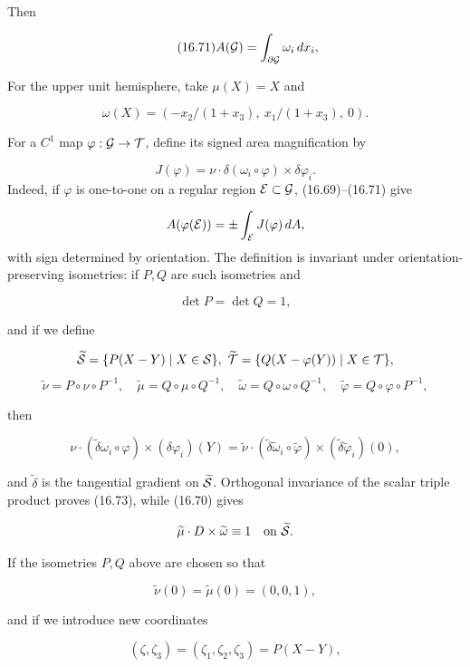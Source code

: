 Then

\begin{equation}\tag{16.71}
A(\mathcal{G})=\int_{\partial\mathcal{G}}\omega_i\,dx_i,
\end{equation}

For the upper unit hemisphere, take $\mu(X)=X$ and

\[
\omega(X)=(-x_2/(1+x_3),\ x_1/(1+x_3),\ 0).
\]

For a $C^1$ map $\varphi:\mathcal{G}\to\mathcal{T}$, define its signed area
magnification by

\begin{equation}\tag{16.72}
J(\varphi)=\nu\cdot
\delta(\omega_i\circ\varphi)\times\delta\varphi_i.
\end{equation}
Indeed, if $\varphi$ is one-to-one on a regular region $\mathcal{E}\subset\mathcal{G}$,
(16.69)--(16.71) give

\[
A(\varphi(\mathcal{E}))
=\pm\int_{\mathcal{E}} J(\varphi)\,dA,
\]
with sign determined by orientation.  The definition is invariant under
orientation-preserving isometries: if $P,Q$ are such isometries and

\[
\det P=\det Q=1,
\]

and if we define

\[
\widetilde{\Sc}=\{P(X-Y)\mid X\in\Sc\},\ \widetilde{\Tc}=\{Q(X-\varphi(Y))\mid X\in\Tc\},
\]
\[
\widetilde{\nu}=P\circ\nu\circ P^{-1},\quad
\widetilde{\mu}=Q\circ\mu\circ Q^{-1},\quad
\widetilde{\omega}=Q\circ\omega\circ Q^{-1},\quad
\widetilde{\varphi}=Q\circ\varphi\circ P^{-1},
\]

then

\begin{equation}\tag{16.73}
\nu\cdot(\widetilde\delta\omega_i\circ\varphi)
\times(\delta\varphi_i)(Y)
=\widetilde\nu\cdot
(\widetilde\delta\widetilde\omega_i\circ\widetilde\varphi)
\times(\widetilde\delta\widetilde\varphi_i)(0),
\end{equation}

and $\widetilde\delta$ is the tangential gradient on $\widetilde{\mathcal{S}}$.
Orthogonal invariance of the scalar triple product proves (16.73), while
(16.70) gives

\[
\widetilde{\mu}\cdot D\times \widetilde{\omega}\equiv 1\quad \text{on }\widetilde{\mathcal{S}}.
\]

If the isometries $P, Q$ above are chosen so that

\[
\widetilde\nu(0)=\widetilde\mu(0)=(0,0,1),
\]

and if we introduce new coordinates

\[
(\zeta,\zeta_3)=(\zeta_1,\zeta_2,\zeta_3)=P(X-Y),
\]

